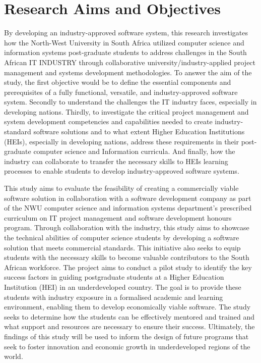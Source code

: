 \section{Research Aims and Objectives}
\par{By developing an industry-approved software system, this research investigates how the North-West University in South 
Africa utilized computer science and information systems post-graduate students to address challenges in the South African 
IT INDUSTRY through collaborative university/industry-applied project management and systems development methodologies.
To answer the aim of the study, the first objective would be to define the essential components and prerequisites of a 
fully functional, versatile, and industry-approved software system. Secondly to understand the challenges the IT industry 
faces, especially in developing nations.  Thirdly, to investigate the critical project management and system development 
competencies and capabilities needed to create industry-standard software solutions and to what extent Higher Education 
Institutions (HEIs), especially in developing nations, address these requirements in their post-graduate computer science 
and Information curricula. And finally, how the industry can collaborate to transfer the necessary skills to HEIs learning 
processes to enable students to develop industry-approved software systems. }
\par{This study aims to evaluate the feasibility of creating a commercially viable software solution in
collaboration with a software development company as part of the NWU computer science and information systems department's 
prescribed curriculum on IT project management and software development honours program. Through collaboration with the 
industry, this study aims to showcase the technical abilities of computer science students by developing a software 
solution that meets commercial standards. This initiative also seeks to equip students with the necessary skills to become 
valuable contributors to the South African workforce. The project aims to conduct a pilot study to identify the key success 
factors in guiding postgraduate students at a Higher Education Institution (HEI) in an underdeveloped country. The goal is 
to provide these students with industry exposure in a formalised academic and learning environment, enabling them to 
develop economically viable software. The study seeks to determine how the students can be effectively mentored and trained 
and what support and resources are necessary to ensure their success.
Ultimately, the findings of this study will be used to inform the design of future programs that seek to foster innovation 
and economic growth in underdeveloped regions of the world.}
